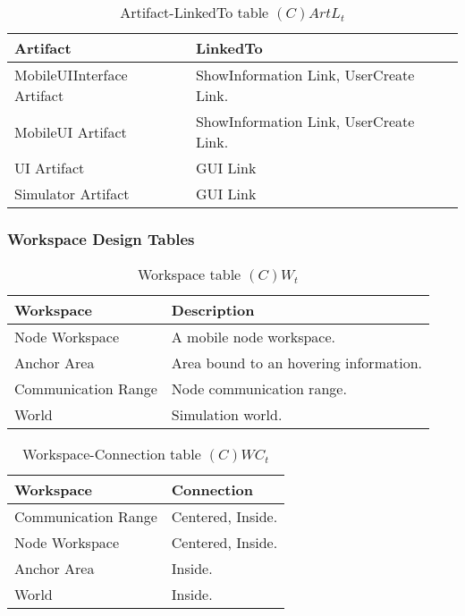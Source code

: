 \begin{table}[H]
	\centering
	\begin{tabular}{|p{4cm}|p{8cm}|}
			\hline
			\textbf{Artifact} & \textbf{LinkedTo} \\
			\hline
			MobileUIInterface Artifact & ShowInformation Link, UserCreate Link. \\
			\hline
			MobileUI Artifact & ShowInformation Link, UserCreate Link. \\
			\hline
			UI Artifact & GUI Link \\
			\hline
			Simulator Artifact & GUI Link \\
      \hline
		\end{tabular}
	\caption{Artifact-LinkedTo table $(C)ArtL_t$}
	\label{tab:cartlt}
\end{table}

\subsubsection{Workspace Design Tables}

\begin{table}[H]
	\centering
	\begin{tabular}{|p{4cm}|p{8cm}|}
			\hline
			\textbf{Workspace} & \textbf{Description} \\
			\hline
			Node Workspace  & A mobile node workspace. \\
			\hline
			Anchor Area  & Area bound to an hovering information. \\
			\hline
			Communication Range  & Node communication range. \\
			\hline
			World  & Simulation world. \\
			\hline
		\end{tabular}
	\caption{Workspace table $(C)W_t$}
	\label{tab:cwt}
\end{table}

\begin{table}[H]
	\centering
	\begin{tabular}{|p{4cm}|p{8cm}|}
			\hline
			\textbf{Workspace} & \textbf{Connection} \\
			\hline
			Communication Range & Centered, Inside. \\
			\hline
			Node Workspace & Centered, Inside. \\
			\hline
			Anchor Area & Inside. \\
			\hline
			World  & Inside. \\
			\hline
		\end{tabular}
	\caption{Workspace-Connection table $(C)WC_t$}
	\label{tab:cwct}
\end{table}

